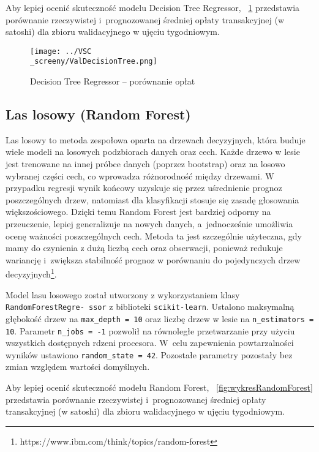 \documentclass[12pt,a4paper]{report}
\theoremstyle{definition} %
\begin{document}
	Aby lepiej ocenić skuteczność modelu Decision Tree Regressor, \figurename~\ref{fig:wykresDecisionTree} przedstawia porównanie rzeczywistej i~prognozowanej średniej opłaty transakcyjnej (w satoshi) dla zbioru walidacyjnego w ujęciu tygodniowym.	

	\begin{figure}[H]
	    \centering
	    \texttt{[image: ../VSC\\\_screeny/ValDecisionTree.png]} 
	    \caption{Decision Tree Regressor – porównanie opłat}
	    \label{fig:wykresDecisionTree}
	\end{figure}
	
	\subsection{Las losowy (Random Forest)}
	\hspace*{\parindent}Las losowy to metoda zespołowa oparta na drzewach decyzyjnych, która buduje wiele modeli na losowych podzbiorach danych oraz cech. Każde drzewo w lesie jest trenowane na innej próbce danych (poprzez bootstrap) oraz na losowo wybranej części cech, co wprowadza różnorodność między drzewami. W przypadku regresji 	wynik końcowy uzyskuje się przez uśrednienie prognoz poszczególnych drzew, natomiast dla klasyfikacji stosuje się zasadę głosowania większościowego. Dzięki temu Random Forest jest bardziej odporny na przeuczenie, lepiej generalizuje na nowych danych, a~jednocześnie umożliwia ocenę ważności poszczególnych cech. Metoda ta jest szczególnie 			użyteczna, gdy mamy do czynienia z dużą liczbą cech oraz obserwacji, ponieważ redukuje wariancję i~zwiększa stabilność prognoz w porównaniu do pojedynczych drzew decyzyjnych\footnote{https://www.ibm.com/think/topics/random-forest}.

	Model lasu losowego został utworzony z wykorzystaniem klasy \texttt{RandomForestRegre- ssor} z biblioteki \texttt{scikit-learn}. Ustalono maksymalną głębokość drzew na \texttt{max\_depth = 10} oraz liczbę drzew w lesie na \texttt{n\_estimators = 10}. Parametr \texttt{n\_jobs = -1} pozwolił na równoległe przetwarzanie przy użyciu wszystkich dostępnych rdzeni procesora. W~celu zapewnienia powtarzalności wyników ustawiono \texttt{random\_state = 42}. Pozostałe parametry pozostały bez zmian względem wartości domyślnych.	

	Aby lepiej ocenić skuteczność modelu Random Forest, \figurename~\ref{fig:wykresRandomForest} przedstawia porównanie rzeczywistej i~prognozowanej średniej opłaty transakcyjnej (w satoshi) dla zbioru walidacyjnego w ujęciu tygodniowym.	
\end{document}
